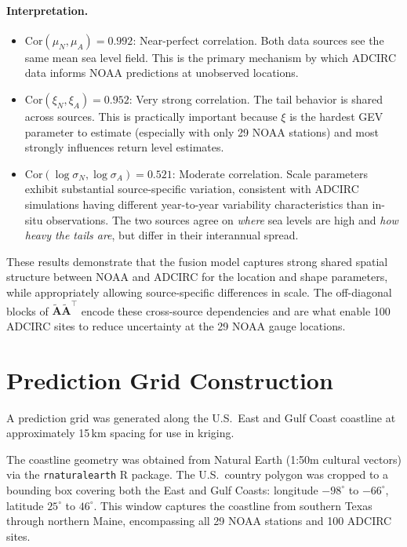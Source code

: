\documentclass[11pt]{article}
\newcommand{\bA}{\mathbf{A}}
\begin{document}
\paragraph{Interpretation.}
\begin{itemize}[nosep]
    \item $\text{Cor}(\mu_N, \mu_A) = 0.992$: Near-perfect correlation. Both data sources see the same mean sea level field. This is the primary mechanism by which ADCIRC data informs NOAA predictions at unobserved locations.
    \item $\text{Cor}(\xi_N, \xi_A) = 0.952$: Very strong correlation. The tail behavior is shared across sources. This is practically important because $\xi$ is the hardest GEV parameter to estimate (especially with only 29 NOAA stations) and most strongly influences return level estimates.
    \item $\text{Cor}(\log\sigma_N, \log\sigma_A) = 0.521$: Moderate correlation. Scale parameters exhibit substantial source-specific variation, consistent with ADCIRC simulations having different year-to-year variability characteristics than in-situ observations. The two sources agree on \emph{where} sea levels are high and \emph{how heavy the tails are}, but differ in their interannual spread.
\end{itemize}

These results demonstrate that the fusion model captures strong shared spatial structure between NOAA and ADCIRC for the location and shape parameters, while appropriately allowing source-specific differences in scale. The off-diagonal blocks of $\tilde{\bA}\tilde{\bA}^\top$ encode these cross-source dependencies and are what enable 100 ADCIRC sites to reduce uncertainty at the 29 NOAA gauge locations.

\section{Prediction Grid Construction}
\label{sec:predgrid}

A prediction grid was generated along the U.S.\ East and Gulf Coast coastline at approximately 15\,km spacing for use in kriging.

The coastline geometry was obtained from Natural Earth (1:50m cultural vectors) via the \texttt{rnaturalearth} R package. The U.S.\ country polygon was cropped to a bounding box covering both the East and Gulf Coasts: longitude $-98^\circ$ to $-66^\circ$, latitude $25^\circ$ to $46^\circ$. This window captures the coastline from southern Texas through northern Maine, encompassing all 29 NOAA stations and 100 ADCIRC sites.
\end{document}
